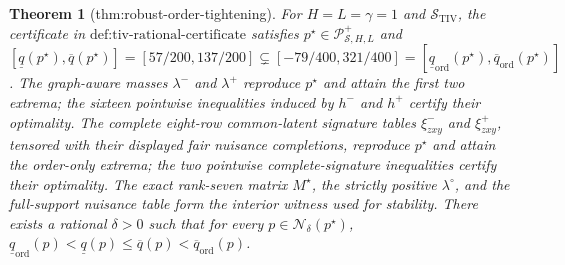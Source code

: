 \documentclass{article}
\newtheorem{theorem}{Theorem}
\begin{document}
\begin{theorem}[thm:robust-order-tightening]\label{thm:robust-order-tightening}
For \(H=L=\gamma=1\) and \(\mathcal S_{\mathrm{TIV}}\), the certificate in \(\text{def:tiv-rational-certificate}\) satisfies \(p^{\star}\in\mathcal P_{\mathcal S,H,L}^{+}\) and \([\underline q(p^{\star}),\overline q(p^{\star})]=[57/200,137/200]\subsetneq[-79/400,321/400]=[\underline q_{\mathrm{ord}}(p^{\star}),\overline q_{\mathrm{ord}}(p^{\star})]\). The graph-aware masses \(\lambda^{-}\) and \(\lambda^{+}\) reproduce \(p^{\star}\) and attain the first two extrema; the sixteen pointwise inequalities induced by \(h^{-}\) and \(h^{+}\) certify their optimality. The complete eight-row common-latent signature tables \(\xi_{zxy}^{-}\) and \(\xi_{zxy}^{+}\), tensored with their displayed fair nuisance completions, reproduce \(p^{\star}\) and attain the order-only extrema; the two pointwise complete-signature inequalities certify their optimality. The exact rank-seven matrix \(M^{\star}\), the strictly positive \(\lambda^{\circ}\), and the full-support nuisance table form the interior witness used for stability. There exists a rational \(\delta>0\) such that for every \(p\in\mathcal N_{\delta}(p^{\star})\), \(\underline q_{\mathrm{ord}}(p)<\underline q(p)\le\overline q(p)<\overline q_{\mathrm{ord}}(p)\).
\end{theorem}
\end{document}

